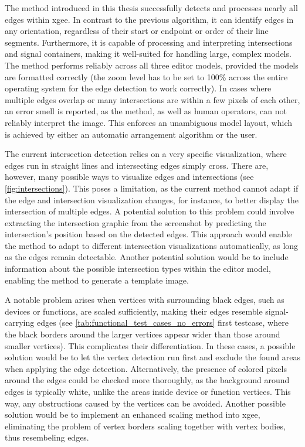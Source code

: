 The method introduced in this thesis successfully detects and processes nearly all edges within \acrshort{xgee}. In contrast to the previous algorithm, it can identify edges in any orientation, regardless of their start or endpoint or order of their line segments. Furthermore, it is capable of processing and interpreting intersections and signal containers, making it well-suited for handling large, complex models. The method performs reliably across all three editor models, provided the models are formatted correctly (the zoom level has to be set to 100\% across the entire operating system for the edge detection to work correctly). In cases where multiple edges overlap or many intersections are within a few pixels of each other, an error smell is reported, as the method, as well as human operators, can not reliably interpret the image. This enforces an unambiguous model layout, which is achieved by either an automatic arrangement algorithm or the user.

The current intersection detection relies on a very specific visualization, where edges run in straight lines and intersecting edges simply cross. There are, however, many possible ways to visualize edges and intersections (see \autoref{fig:intersections}). This poses a limitation, as the current method cannot adapt if the edge and intersection visualization changes, for instance, to better display the intersection of multiple edges. A potential solution to this problem could involve extracting the intersection graphic from the screenshot by predicting the intersection's position based on the detected edges. This approach would enable the method to adapt to different intersection visualizations automatically, as long as the edges remain detectable. Another potential solution would be to include information about the possible intersection types within the editor model, enabling the method to generate a template image.

A notable problem arises when vertices with surrounding black edges, such as devices or functions, are scaled sufficiently, making their edges resemble signal-carrying edges (see \autoref{tab:functional_test_cases_no_errors} first testcase, where the black borders around the larger vertices appear wider than those around smaller vertices). This complicates their differentiation. In these cases, a possible solution would be to let the vertex detection run first and exclude the found areas when applying the edge detection. Alternatively, the presence of colored pixels around the edges could be checked more thoroughly, as the background around edges is typically white, unlike the areas inside device or function vertices. This way, any obstructions caused by the vertices can be avoided. Another possible solution would be to implement an enhanced scaling method into \acrshort{xgee}, eliminating the problem of vertex borders scaling together with vertex bodies, thus resembeling edges.

